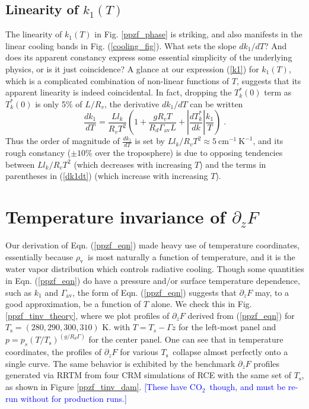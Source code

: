 \documentclass[10pt]{article}
\newcommand{\comment}[1]{\textcolor{blue}{[{#1}]}}
\newcommand{\beqn}{\begin{equation}}
\newcommand{\eeqn}{\end{equation}}
\newcommand{\eqnref}[1]{(\ref{#1})}
\newcommand{\der}[2]{\ensuremath{\frac{d #1}{d #2}}}
\newcommand{\ppz}{\ensuremath{\partial_z}}
\newcommand{\cotwo}{\ensuremath{\mathrm{CO_2}}}
\newcommand{\FLW}{\ensuremath{F}}
\newcommand{\cminverse}{\ensuremath{\mathrm{cm^{-1}}}}
\newcommand{\rhov}{\ensuremath{\rho_\mathrm{v}}}
\newcommand{\Ts}{\ensuremath{T_\mathrm{s}}}
\newcommand{\ps}{\ensuremath{p_s}}
\newcommand{\gammaav}{\ensuremath{\Gamma_\mathrm{av}}}
\newcommand{\Kinverse}{\ensuremath{\mathrm{K^{-1}}}}
\begin{document}
	\subsection{Linearity of $k_1(T)$}
The linearity of  $k_1(T)$ in Fig. \ref{ppzf_phase} is striking, and also manifests in the linear cooling bands in Fig. \eqnref{cooling_fig}. What sets the slope $d k_1/dT$? And does its apparent constancy express some essential simplicity of the underlying physics, or is it just coincidence? A glance at our expression \eqnref{k1} for $k_1(T)$, which is a complicated combination of non-linear functions of $T$, suggests that its apparent  linearity is indeed coincidental. In fact,  dropping the $T_k^*(0)$ term as $T_k^*(0)$ is only 5\% of $L/R_v$, the derivative $d k_1/dT$ can be written
	\beqn
		\der{k_1}{T} = \frac{Ll_k}{R_v T^2}\left( 1 + \frac{gR_vT}{R_d \gammaav L} + \left|\der{T_k^*}{k}\right| \frac{k_1}{T} \right) \; .
	\label{dk1dt}
	\eeqn
Thus the order of magnitude of $\der{k_1}{T}$ is set by $Ll_k/R_vT^2 \approx 5\ \cminverse\ \Kinverse $, and its rough constancy ($\pm 10\%$ over the troposphere) is due to opposing tendencies between $Ll_k/R_vT^2$ (which decreases with increasing $T$) and the terms in parentheses in \eqnref{dk1dt} (which increase with increasing $T$).

\section{Temperature invariance of  $\ppz \FLW$} 
Our derivation of Eqn. \eqnref{ppzf_eqn} made heavy use of temperature coordinates, essentially because \rhov\ is most naturally a function of temperature, and it is the water vapor distribution which controls radiative cooling. Though some quantities in Eqn. \eqnref{ppzf_eqn} do have a pressure and/or surface temperature dependence, such as $k_1$ and $\gammaav$, the form of Eqn. \eqnref{ppzf_eqn} suggests that $\ppz F$ may, to a good approximation, be a function of $T$ alone. We check this in Fig. \ref{ppzf_tinv_theory}, where we plot profiles of $\ppz F$ derived from \eqnref{ppzf_eqn} for $\Ts=(280,290,300,310)$ K. with $T=T_s-\Gamma z$ for the left-most panel and $p=\ps(T/\Ts)^{(g/R_d\Gamma)}$ for the center panel. One can see that in temperature coordinates, the profiles of $\ppz F$ for various \Ts\ collapse almost perfectly onto a single curve. The same behavior is exhibited by the benchmark $\ppz F$ profiles generated via RRTM from four CRM simulations of RCE with the same set of \Ts, as shown in Figure \ref{ppzf_tinv_dam}. \comment{These have \cotwo\ though, and must be re-run without for production runs.}
\end{document}

